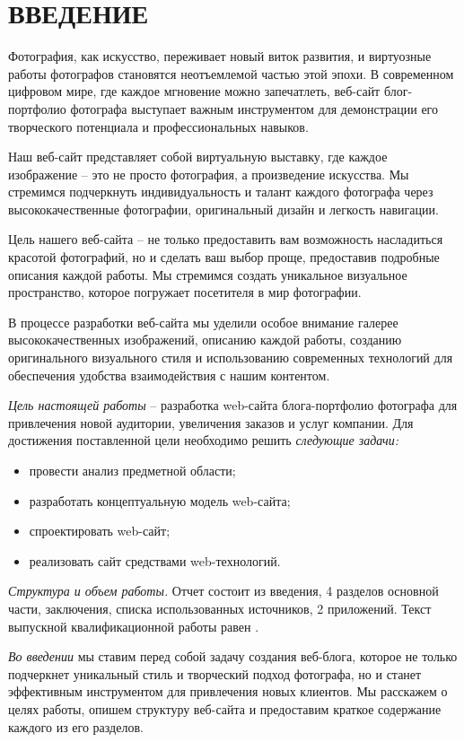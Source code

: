 \section*{ВВЕДЕНИЕ}
Фотография, как искусство, переживает новый виток развития, и виртуозные работы фотографов становятся неотъемлемой частью этой эпохи. В современном цифровом мире, где каждое мгновение можно запечатлеть, веб-сайт блог-портфолио фотографа выступает важным инструментом для демонстрации его творческого потенциала и профессиональных навыков.

Наш веб-сайт представляет собой виртуальную выставку, где каждое изображение – это не просто фотография, а произведение искусства. Мы стремимся подчеркнуть индивидуальность и талант каждого фотографа через высококачественные фотографии, оригинальный дизайн и легкость навигации.

Цель нашего веб-сайта – не только предоставить вам возможность насладиться красотой фотографий, но и сделать ваш выбор проще, предоставив подробные описания каждой работы. Мы стремимся создать уникальное визуальное пространство, которое погружает посетителя в мир фотографии.

В процессе разработки веб-сайта мы уделили особое внимание галерее высококачественных изображений, описанию каждой работы, созданию оригинального визуального стиля и использованию современных технологий для обеспечения удобства взаимодействия с нашим контентом.

\emph{Цель настоящей работы} – разработка web-сайта блога-портфолио фотографа для привлечения новой аудитории, увеличения заказов и услуг компании. Для достижения поставленной цели необходимо решить \emph{следующие задачи:}
\begin{itemize}
\item провести анализ предметной области;
\item разработать концептуальную модель web-сайта;
\item спроектировать web-сайт;
\item реализовать сайт средствами web-технологий.
\end{itemize}

\emph{Структура и объем работы.} Отчет состоит из введения, 4 разделов основной части, заключения, списка использованных источников, 2 приложений. Текст выпускной квалификационной работы равен .


\emph{Во введении} мы ставим перед собой задачу создания веб-блога, которое не только подчеркнет уникальный стиль и творческий подход фотографа, но и станет эффективным инструментом для привлечения новых клиентов. Мы расскажем о целях работы, опишем структуру веб-сайта и предоставим краткое содержание каждого из его разделов.

